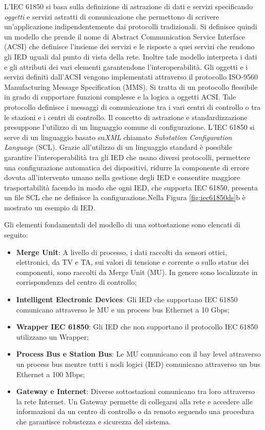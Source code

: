 \newline
L'IEC 61850 si basa sulla definizione di astrazione di dati e servizi specificando \emph{oggetti} e {servizi astratti} di comunicazione che permettono di scrivere un'applicazione indipendentemente dai protocolli tradizionali. Si definisce quindi un modello che prende il nome di Abstract Communication Service Interface (ACSI) che definisce l'insieme dei servizi e le risposte a quei servizi che rendono gli IED uguali dal punto di vista della rete. Inoltre tale modello interpreta i dati e gli attributi dei vari elementi garantendone l'interoperabilità. Gli oggetti e i servizi definiti dall'ACSI vengono implementati attraverso il protocollo ISO-9560 Manufacturing Message Specification (MMS). Si tratta di un protocollo flessibile in grado di supportare funzioni complesse e la logica a oggetti ACSI. Tale protocollo definisce i messaggi di comunicazione tra i vari centri di controllo o tra le stazioni e i centri di controllo.\newline
Il concetto di astrazione e standardizzazione presuppone l'utilizzo di un linguaggio comune di configurazione. L'IEC 61850 si serve di un linguaggio basato su\emph{XML} chiamato \emph{Substation Configuration Language} (SCL). Grazie all'utilizzo di un linguaggio standard è possibile garantire l'interoperabilità tra gli IED che usano diversi protocolli, permettere una configurazione automatica dei dispositivi, ridurre la componente di errore dovuta all'intervento umano nella gestione degli IED e consentire maggiore trasportabilità facendo in modo che ogni IED, che supporta IEC 61850, presenta un file SCL che ne definisce la configurazione.Nella Figura \ref{fig:iec61850ds}b è mostrato un esempio di IED.\newline

Gli elementi fondamentali del modello di una sottostazione sono elencati di seguito:
\begin{itemize}
	\item\textbf{Merge Unit}: A livello di processo, i dati raccolti da sensori ottici, elettronici, da TV e TA, sui valori di tensione e corrente o sullo status dei componenti, sono raccolti da Merge Unit (MU). In genere sono localizzate in corrispondenza del centro di controllo;
	\item\textbf{Intelligent Electronic Devices}: Gli IED che supportano IEC 61850 comunicano attraverso le MU e un process bus Ethernet a 10 Gbps;
	\item\textbf{Wrapper IEC 61850}: Gli IED che non supportano il protocollo IEC 61850 utilizzano un Wrapper;
	\item\textbf{Process Bus e Station Bus}: Le MU comunicano con il bay level attraverso un process bus mentre tutti i nodi logici (IED) comunicano attraverso un bus Ethernet a 100 Mbps;
	\item\textbf{Gateway e Internet}: Diverse sottostazioni comunicano tra loro attraverso la rete Internet. Un Gateway permette di collegarsi alla rete e accedere alle informazioni da un centro di controllo o da remoto seguendo una procedura che garantisce robustezza e sicurezza del sistema.
\end{itemize}

